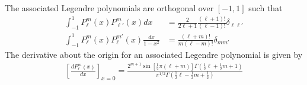 The associated Legendre polynomials are orthogonal over $[-1,1]$ such that
\begin{align}
\int_{-1}^{1}P_\ell^m(x)P_{\ell'}^m(x)dx &= \frac{2}{2\ell+1}\frac{(\ell+1)!}{(\ell-1)!}\delta_{\ell\ell'} \\
\int_{-1}^{1}P_\ell^m(x)P_{\ell}^{m'}(x)\frac{dx}{1-x^2} &= \frac{(\ell+m)!}{m(\ell-m)!}\delta_{mm'}
\end{align}
The derivative about the origin for an associated Legendre polynomial is given by
\begin{align}
	\left[\frac{dP_\ell^m(x)}{dx}\right]_{x=0} = \frac{2^{m+1}\sin\left[\frac{1}{2}\pi(\ell+m)\right]\Gamma\left(\frac{1}{2}\ell+\frac{1}{2}m+1\right)}{\pi^{1/2
	}\Gamma\left(\frac{1}{2}\ell-\frac{1}{2}m+\frac{1}{2}\right)}
\end{align}
	


\newpage
